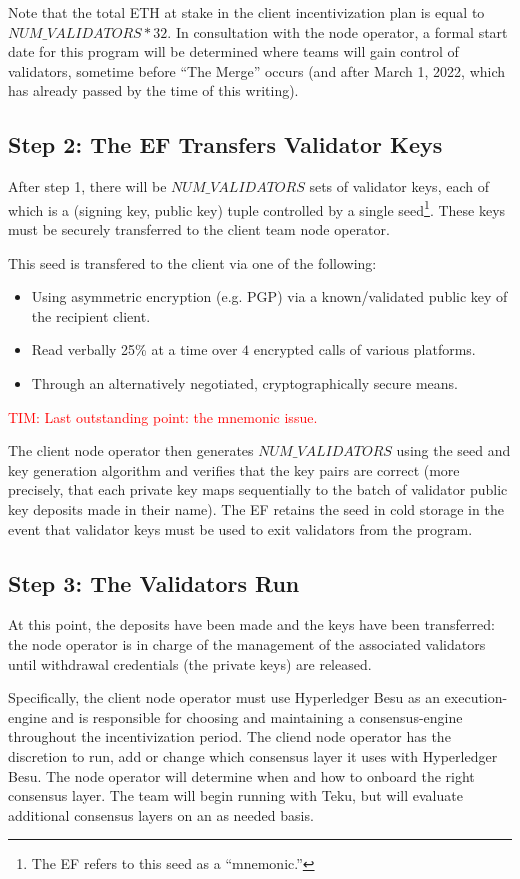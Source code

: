 Note that the total ETH at stake in the client incentivization plan is equal to $NUM\_VALIDATORS * 32$. In consultation with the node operator, a formal start date for this program will be determined where teams will gain control of validators, sometime before ``The Merge'' occurs (and after March 1, 2022, which has already passed by the time of this writing).

\subsection{Step 2:  The EF Transfers Validator Keys}
After step 1, there will be $NUM\_VALIDATORS$ sets of validator keys, each of which is a (signing key, public key) tuple controlled by a single seed\footnote{The EF refers to this seed as a ``mnemonic.''}. These keys must be securely transferred to the client team node operator.

This seed is transfered to the client via one of the following:
\begin{itemize}
\item Using asymmetric encryption (e.g. PGP) via a known/validated public key of the recipient client.
\item Read verbally 25\% at a time over $4$ encrypted calls of various platforms.
\item Through an alternatively negotiated, cryptographically secure means.
\end{itemize}

\textcolor{red}{TIM:  Last outstanding point:  the mnemonic issue.}

The client node operator then generates $NUM\_VALIDATORS$ using the seed and key generation algorithm and verifies that the key pairs are correct (more precisely, that each private key maps sequentially to the batch of validator public key deposits made in their name). The EF retains the seed in cold storage in the event that validator keys must be used to exit validators from the program.


\subsection{Step 3:  The Validators Run}
At this point, the deposits have been made and the keys have been transferred:  the node operator is in charge of the management of the associated validators until withdrawal credentials (the private keys) are released. 

Specifically, the client node operator must use Hyperledger Besu as an execution-engine and is responsible for choosing and maintaining a consensus-engine throughout the incentivization period.  The cliend node operator has the discretion to run, add or change which consensus layer it uses with Hyperledger Besu. The node operator will determine when and how to onboard the right consensus layer. The team will begin running with Teku, but will evaluate additional consensus layers on an as needed basis.

